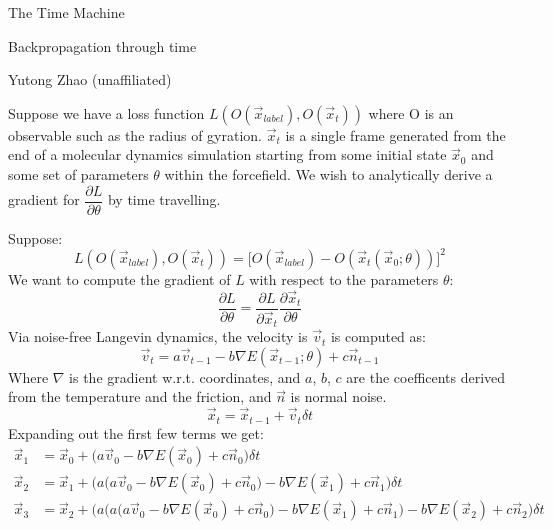 \documentclass{article}
\begin{document}
\centerline{\sc \large The Time Machine}
\vspace{.5pc}
\centerline{\sc Backpropagation through time}
\vspace{.5pc}
\centerline{Yutong Zhao (unaffiliated)}
\vspace{2pc}


Suppose we have a loss function $L(O(\vec{x}_{label}), O(\vec{x}_t))$ where O is an observable such as the radius of gyration. $\vec{x}_t$ is a single frame generated from the end of a molecular dynamics simulation starting from some initial state $\vec{x}_0$ and some set of parameters $\theta$ within the forcefield. We wish to analytically derive a gradient for $\dfrac{\partial L}{\partial \theta}$ by time travelling.

Suppose:
\begin{equation}
L(O(\vec{x}_{label}), O(\vec{x}_t)) = \lbrack O(\vec{x}_{label}) - O(\vec{x}_t(\vec{x}_0;\theta)) \rbrack ^2
\end{equation}
We want to compute the gradient of $L$ with respect to the parameters $\theta$:
\begin{equation}
\dfrac {\partial L}{\partial \theta} = \dfrac{\partial L}{\partial \vec{x}_t} \dfrac{\partial \vec{x}_t}{\partial \theta} 
\end{equation}
Via noise-free Langevin dynamics, the velocity is $\vec{v}_t$ is computed as:
\begin{equation}
\vec{v}_t = a \vec{v}_{t-1} - b \nabla E(\vec{x}_{t-1};\theta) + c \vec{n}_{t-1}
\end{equation}
Where $\nabla$ is the gradient w.r.t. coordinates, and $a$, $b$, $c$ are the coefficents derived from the temperature and the friction, and $\vec{n}$ is normal noise.
\begin{equation}
\vec{x}_{t} = \vec{x}_{t-1} + \vec{v}_{t} \delta t
\end{equation}
Expanding out the first few terms we get:
\begin{equation}
\begin{split}
\vec{x}_1  &= \vec{x}_0 + \big(a \vec{v}_0 - b \nabla E(\vec{x}_0) + c \vec{n}_0  \big) \delta t \\
\vec{x}_2  &= \vec{x}_1 + \bigg( a \Big( a \vec{v}_0 - b \nabla E(\vec{x}_0) + c \vec{n}_0 \Big) - b \nabla E(\vec{x}_1) + c \vec{n}_1 \bigg) \delta t \\
\vec{x}_3  &= \vec{x}_2 + \Bigg(a\bigg(a \Big( a \vec{v}_0 - b \nabla E(\vec{x}_0) + c \vec{n}_0 \Big) - b \nabla E(\vec{x}_1) + c \vec{n}_1 \bigg) - b \nabla E(\vec{x}_2) + c \vec{n}_2 \Bigg) \delta t \\
\end{split}
\end{equation}
\end{document}
